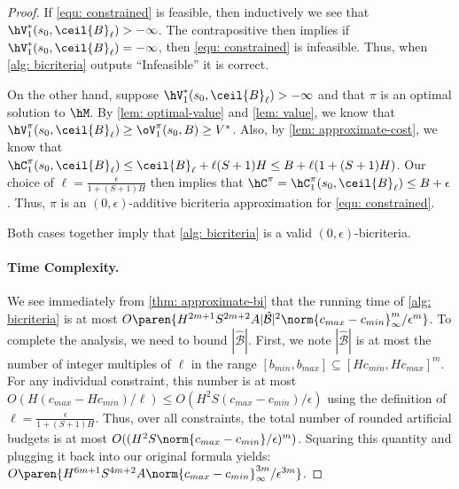 \documentclass[pdftex, a4paper, 12pt]{article}
\newcommand{\round}[2]{\ceil{#2}_{#1}}
\newcommand{\cmin}{c_{min}}
\newcommand{\cmax}{c_{max}}
\newcommand{\bmax}{b_{max}}
\newcommand{\bmin}{b_{min}}
\newcommand{\hmB}{\hat{\mathcal{B}}}
\begin{document}


\begin{proof}
    If \eqref{equ: constrained} is feasible, then inductively we see that $\hV^*_{1}(s_0, \round{\ell}{B}) > -\infty$. The contrapositive then implies if $\hV^*_{1}(s_0, \round{\ell}{B}) = -\infty$, then \eqref{equ: constrained} is infeasible. Thus, when \cref{alg: bicriteria} outputs ``Infeasible'' it is correct.

    On the other hand, suppose $\hV^*_{1}(s_0, \round{\ell}{B}) > -\infty$ and that $\pi$ is an optimal solution to $\hM$. By \cref{lem: optimal-value} and \cref{lem: value}, we know that $\hV^{\pi}_1(s_0, \round{\ell}{B}) \geq \oV^{\pi}_1(s_0, B) \geq V^*$. Also, by \cref{lem: approximate-cost}, we know that $\hC^{\pi}_1(s_0, \round{\ell}{B}) \leq \round{\ell}{B} + \ell(S+1)H \leq B + \ell(1 + (S+1)H)$. Our choice of $\ell = \frac{\epsilon}{1 + (S+1)H}$ then implies that $\hC^{\pi} = \hC^{\pi}_1(s_0, \round{\ell}{B}) \leq B + \epsilon$. Thus, $\pi$ is an $(0, \epsilon)$-additive bicriteria approximation for \eqref{equ: constrained}.

    Both cases together imply that \cref{alg: bicriteria} is a valid $(0,\epsilon)$-bicriteria.
    
    \paragraph{Time Complexity.} We see immediately from \cref{thm: approximate-bi} that the running time of \cref{alg: bicriteria} is at most $O\paren{H^{2m+1}S^{2m+2}A|\hmB|^2\norm{\cmax - \cmin}_{\infty}^m/\epsilon^m}$. To complete the analysis, we need to bound $|\hmB|$. First, we note $|\hmB|$ is at most the number of integer multiples of $\ell$ in the range $[\bmin, \bmax] \subseteq [H\cmin, H\cmax]^m$. For any individual constraint, this number is at most $O(H(\cmax - H\cmin)/\ell) \leq O(H^2S(\cmax - \cmin)/\epsilon)$ using the definition of $\ell = \frac{\epsilon}{1 + (S+1)H}$. Thus, over all constraints, the total number of rounded artificial budgets is at most $O((H^2S\norm{\cmax - \cmin}/\epsilon)^m)$. Squaring this quantity and plugging it back into our original formula yields: $O\paren{H^{6m+1}S^{4m+2}A\norm{\cmax - \cmin}_{\infty}^{3m}/\epsilon^{3m}}$.
    
\end{proof}
\end{document}
